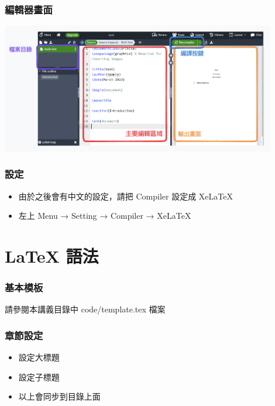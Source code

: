 \documentclass[mathserif]{beamer}
\begin{document}
\begin{frame}
    \frametitle{編輯器畫面}
    \begin{center}
        \includegraphics[width=12.0cm]{img/editor.png}
    \end{center}
\end{frame}

\begin{frame}
    \frametitle{設定}
    \begin{itemize}
        \item 由於之後會有中文的設定，請把 Compiler 設定成 XeLaTeX
        \item 左上 Menu → Setting → Compiler → XeLaTeX
    \end{itemize}
\end{frame}

\section{LaTeX 語法}

\begin{frame}
    \frametitle{基本模板}
    請參閱本講義目錄中 code/template.tex 檔案

\end{frame}

\begin{frame}
    \frametitle{章節設定}
    \begin{itemize}
        \item {\color{red}{\textbackslash section}} 設定大標題
        \item {\color{red}{\textbackslash subsection}} 設定子標題
        \vspace{0.5cm}
        \item 以上會同步到目錄上面
    \end{itemize}
\end{frame}
\end{document}
